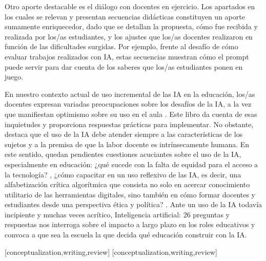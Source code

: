 \documentclass[spanish]{textolivre}
\begin{document}
Otro aporte destacable es el diálogo con docentes en ejercicio. Los apartados en los cuales se relevan y presentan secuencias didácticas constituyen un aporte sumamente enriquecedor, dado que se detallan la propuesta, cómo fue recibida y realizada por los/as estudiantes, y los ajustes que los/as docentes realizaron en función de las dificultades surgidas. Por ejemplo, frente al desafío de cómo evaluar trabajos realizados con IA, estas secuencias muestran cómo el prompt puede servir para dar cuenta de los saberes que los/as estudiantes ponen en juego.

En nuestro contexto actual de uso incremental de las IA en la educación, los/as docentes expresan variadas preocupaciones sobre los desafíos de la IA, a la vez que manifiestan optimismo sobre su uso en el aula \cite{almutawah2026aied,sartorharada2026professores}. Este libro da cuenta de esas inquietudes y proporciona respuestas prácticas para implementar. No obstante, destaca que el uso de la IA debe atender siempre a las características de los sujetos y a la premisa de que la labor docente es intrínsecamente humana. En este sentido, quedan pendientes cuestiones acuciantes sobre el uso de la IA, especialmente en educación: ¿qué sucede con la falta de equidad para el acceso a la tecnología? \cite{sartorharada2026professores}, ¿cómo capacitar en un uso reflexivo de las IA, es decir, una alfabetización crítica algorítmica que consista no solo en acercar conocimiento utilitario de las herramientas digitales, sino también en cómo formar docentes y estudiantes desde una perspectiva ética y política? \cite{gonsales2023ianeducacao,picao2024iaeducacao,sartorharada2026professores}. Ante un uso de la IA todavía incipiente y muchas veces acrítico, Inteligencia artificial: 26 preguntas y respuestas nos interroga sobre el impacto a largo plazo en los roles educativos y convoca a que sea la escuela la que decida qué educación construir con la IA. 


\printbibliography\label{sec-bib}

\begin{contributors}
[conceptualization,writing,review]
[conceptualization,writing,review]
\end{contributors}

\begin{dataavailability}
\end{dataavailability}
\end{document}
